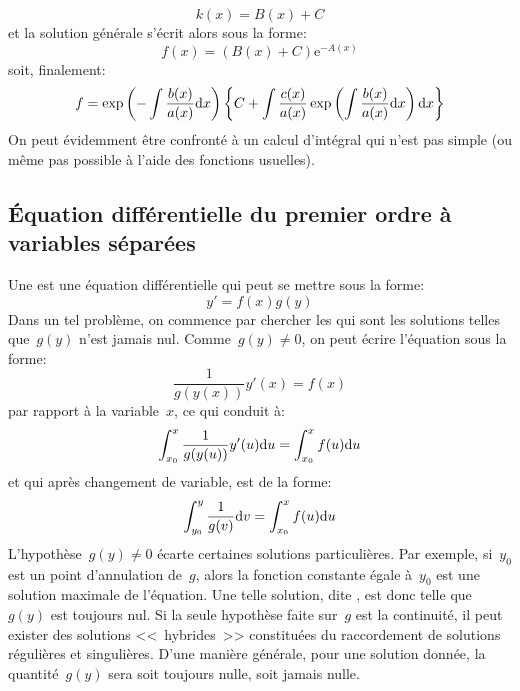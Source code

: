 \begin{equation}
k(x) = B(x) + C
\end{equation}
et la solution générale s'écrit alors sous la forme:
\begin{equation}
f(x) = (B(x) + C) \mathrm{e}^{-A(x)}
\end{equation}
soit, finalement:
\begin{equation}
f = \exp\left( -\int\frac{b(x)}{a(x)}\text{d} x \right) \left\{ C + \int \frac{c(x)}{a(x)} \exp\left(\int \frac{b(x)}{a(x)}\text{d} x \right)\text{d} x \right\}
\end{equation}
On peut évidemment être confronté à un calcul d'intégral qui n'est pas simple (ou même pas possible à l'aide des fonctions usuelles). 
 
\subsection{Équation différentielle du premier ordre à variables séparées} 
Une  est une équation différentielle qui peut se mettre sous la forme:
\begin{equation}
y' = f(x)g(y)
\end{equation}
Dans un tel problème, on commence par chercher les  qui sont les solutions telles que~$g(y)$ n'est jamais nul. Comme~$g(y)\ne0$, on peut écrire l'équation sous la forme:
\begin{equation}
\frac{1}{g(y(x))} y'(x) = f(x)
\end{equation}
par rapport à la variable~$x$, ce qui conduit à:
\begin{equation}
\int_{x_0}^x \frac{1}{g(y(u))}y'(u) \text{d} u = \int_{x_0}^x f(u) \text{d} u 
\end{equation}
et qui après changement de variable, est de la forme:
\begin{equation}
\int_{y_0}^y \frac{1}{g(v)} \text{d} v = \int_{x_0}^x f(u) \text{d} u 
\end{equation}
L'hypothèse~$g(y)\ne0$ écarte certaines solutions particulières. Par exemple, si~$y_0$ est un point d'annulation de~$g$, alors la fonction constante égale à~$y_0$ est une solution maximale de l'équation. Une telle solution, dite , est donc telle que~$g(y)$ est toujours nul. Si la seule hypothèse faite sur~$g$ est la continuité, il peut exister des solutions <<~hybrides~>> constituées du raccordement de solutions régulières et singulières. D'une manière générale, pour une solution donnée, la quantité~$g(y)$ sera soit toujours nulle, soit jamais nulle. 

